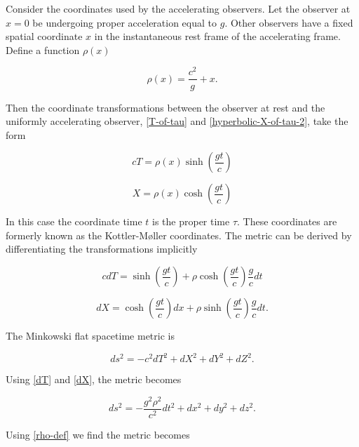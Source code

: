 \documentclass[11pt]{article}
\begin{document}
Consider the coordinates used by the accelerating observers. Let the observer at $x=0$ be undergoing proper acceleration equal to $g$. Other observers have a fixed spatial coordinate $x$ in the instantaneous rest frame of the accelerating frame. Define a function $\rho (x)$

\begin{equation}
    \label{rho-def}
    \rho (x) = \frac{c^2}{g} + x.
\end{equation}

Then the coordinate transformations between the observer at rest and the uniformly accelerating observer, \eqref{T-of-tau} and \eqref{hyperbolic-X-of-tau-2}, take the form

\begin{equation}
    cT = \rho (x) \sinh \left( \frac{g t}{c}\right)
\end{equation}

\begin{equation}
    X = \rho (x) \cosh \left( \frac{g t}{c}\right)
\end{equation}

In this case the coordinate time $t$ is the proper time $\tau$. These coordinates are formerly known as the Kottler-Møller coordinates. The metric can be derived by differentiating the transformations implicitly

\begin{equation}
    \label{dT}
    cdT = \sinh \left( \frac{g t}{c}\right) + \rho \cosh \left( \frac{g t}{c}\right) \frac{g}{c}dt
\end{equation}

\begin{equation}
    \label{dX}
    dX = \cosh \left( \frac{g t}{c}\right)dx + \rho \sinh \left( \frac{g t}{c}\right) \frac{g}{c} dt.
\end{equation}

The Minkowski flat spacetime metric is

\begin{equation}
    ds^2 = -c^2 dT^2 + dX^2 + dY^2 + dZ^2.
\end{equation}

Using \eqref{dT} and \eqref{dX}, the metric becomes

\begin{equation}
    ds^2 = -\frac{g^2 \rho^2}{c^2} dt^2 + dx^2 + dy^2 + dz^2.
\end{equation}

Using \eqref{rho-def} we find the metric becomes
\end{document}
